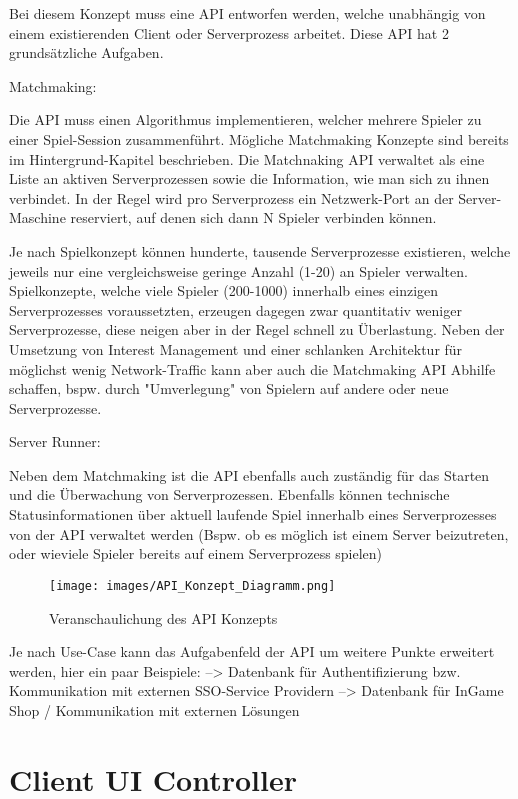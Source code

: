 Bei diesem Konzept muss eine API entworfen werden, welche unabhängig von einem existierenden Client oder Serverprozess arbeitet. Diese API hat 2 grundsätzliche Aufgaben. 

Matchmaking:

Die API muss einen Algorithmus implementieren, welcher mehrere Spieler zu einer Spiel-Session zusammenführt. Mögliche Matchmaking Konzepte sind bereits im Hintergrund-Kapitel beschrieben. Die Matchnaking API verwaltet als eine Liste an aktiven Serverprozessen sowie die Information, wie man sich zu ihnen verbindet. In der Regel wird pro Serverprozess ein Netzwerk-Port an der Server-Maschine reserviert, auf denen sich dann N Spieler verbinden können.

Je nach Spielkonzept können hunderte, tausende Serverprozesse existieren, welche jeweils nur eine vergleichsweise geringe Anzahl (1-20) an Spieler verwalten. Spielkonzepte, welche viele Spieler (200-1000) innerhalb eines einzigen Serverprozesses voraussetzten, erzeugen dagegen zwar quantitativ weniger Serverprozesse, diese neigen aber in der Regel schnell zu Überlastung. Neben der Umsetzung von Interest Management und einer schlanken Architektur für möglichst wenig Network-Traffic kann aber auch die Matchmaking API Abhilfe schaffen, bspw. durch "Umverlegung" von Spielern auf andere oder neue Serverprozesse.

Server Runner:

Neben dem Matchmaking ist die API ebenfalls auch zuständig für das Starten und die Überwachung von Serverprozessen.
Ebenfalls können technische Statusinformationen über aktuell laufende Spiel innerhalb eines Serverprozesses von der API verwaltet werden (Bspw. ob es möglich ist einem Server beizutreten, oder wieviele Spieler bereits auf einem Serverprozess spielen)

\begin{figure}
	\centering
	\texttt{[image: images/API\_Konzept\_Diagramm.png]}
	\caption[API Konzept Diagramm]{Veranschaulichung des API Konzepts}
	\label{pic:API_Konzept_Diagramm}
\end{figure}


Je nach Use-Case kann das Aufgabenfeld der API um weitere Punkte erweitert werden, hier ein paar Beispiele:
--> Datenbank für Authentifizierung bzw. Kommunikation mit externen SSO-Service Providern \cite{Wikipedia.2021c} 
--> Datenbank für InGame Shop / Kommunikation mit externen Lösungen


\section{Client UI Controller}


